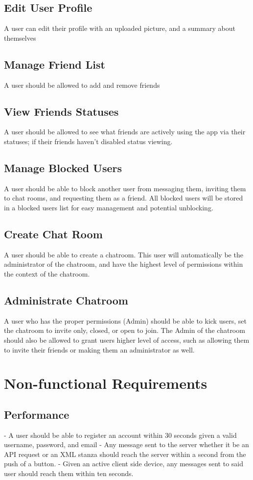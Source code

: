 \documentclass[11pt]{article}
\theoremstyle{plain}
\theoremstyle{definition}
\begin{document}
\subsection{Edit User Profile}
A user can edit their profile with an uploaded picture, and a summary about themselves
\subsection{Manage Friend List}
A user should be allowed to add and remove friends
\subsection{View Friends Statuses}
A user should be allowed to see what friends are actively using the app via their statuses; if their friends haven't disabled status viewing. 
\subsection{Manage Blocked Users}
A user should be able to block another user from messaging them, inviting them to chat rooms, and requesting them as a friend. All blocked users will be stored in a blocked users list for easy management and potential unblocking. 
\subsection{Create Chat Room}
A user should be able to create a chatroom. This user will automatically be the administrator of the chatroom, and have the highest level of permissions within the context of the chatroom.
\subsection{Administrate Chatroom}
A user who has the proper permissions (Admin) should be able to kick users, set the chatroom to invite only, closed, or open to join. The Admin of the chatroom should also be allowed to grant users higher level of access, such as allowing them to invite their friends or making them an administrator as well.

\section{Non-functional Requirements}\label{sec:nonfuncrequirements}
\subsection{Performance}
- A user should be able to register an account within 30 seconds given a valid username, 
  password, and email
\newline
- Any message sent to the server whether it be an API request or an XML stanza should reach 
  the server within a second from the push of a button.
\newline
- Given an active client side device, any messages sent to said user should reach them 
  within ten seconds.
\end{document}
